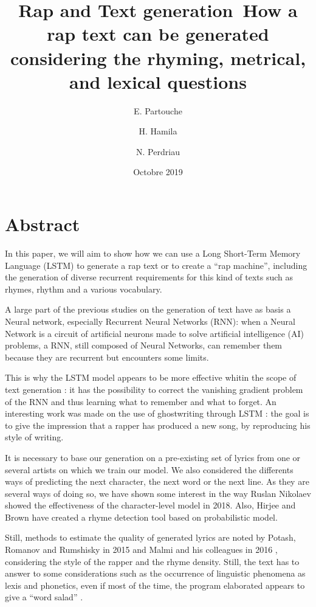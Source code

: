 \documentclass[12pt,a4paper]{article}
\title{Rap and Text generation\newline\ How a rap text can be generated considering the rhyming, metrical, and lexical questions}
\date{Octobre 2019}
\author{E. Partouche \and H. Hamila \and N. Perdriau}
\begin{document}
\maketitle
\tableofcontents
\newpage

\section{Abstract}

In this paper, we will aim to show how we can use a Long Short-Term Memory Language (LSTM) to generate a rap text or to create a “rap machine”, including the generation of diverse recurrent requirements for this kind of texts such as rhymes, rhythm and a various vocabulary. \newline

A large part of the previous studies on the generation of text \cite{sutskever_generating_nodate} have as basis a Neural network, especially Recurrent Neural Networks (RNN): when a Neural Network is a circuit of artificial neurons made to solve artificial intelligence (AI) problems, a RNN, still composed of Neural Networks, can remember them because they are recurrent but encounters some limits.\newline

This is why the LSTM model appears to be more effective whitin the scope of text generation : it has the possibility to correct the vanishing gradient problem of the RNN and thus learning what to remember and what to forget. An interesting work was made on the use of ghostwriting through LSTM  \cite{potash_ghostwriter:_2015} : the goal is to give the impression that a rapper has produced a new song, by reproducing his style of writing. \newline

It is necessary to base our generation on a pre-existing set of lyrics from one or several artists on which we train our model. We also considered the differents ways of predicting the next character, the next word or the next line. As they are several ways of doing so, we have shown some interest in the way Ruslan Nikolaev \cite{nikolaev_generating_2018} showed the effectiveness of the character-level model in 2018. Also, Hirjee and Brown have created a rhyme detection tool based on probabilistic model.\cite{hirjee_using_2010} \newline

Still, methods to estimate the quality of generated lyrics are noted by Potash, Romanov and Rumshisky in 2015 and Malmi and his colleagues in 2016 \cite{malmi_dopelearning:_2016}, considering the style of the rapper and the rhyme density. Still, the text has to answer to some considerations such as the occurrence of linguistic phenomena as lexis and phonetics, even if most of the time, the program elaborated appears to give a “word salad”   \cite{oliveira_automatic_nodate}. \newline
\end{document}
